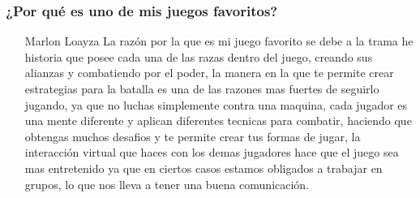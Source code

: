 \subsubsection{¿Por qué es uno de mis juegos favoritos?}
\begin{itemize}
\item[Marlon Loayza] La razón por la que es mi juego favorito se debe a la trama he historia que posee cada una de las razas dentro del juego, creando sus alianzas y combatiendo por el poder, la manera en la que te permite crear estrategias para la batalla es una de las razones mas fuertes de seguirlo jugando, ya que no luchas simplemente contra una maquina, cada jugador es una mente diferente y aplican diferentes tecnicas para combatir, haciendo que obtengas muchos desafios y te permite crear tus formas de jugar, la interacción virtual que haces con los demas jugadores hace que el juego sea mas entretenido ya que en ciertos casos estamos obligados a trabajar en grupos, lo que nos lleva a tener una buena comunicación. 
\end{itemize}
